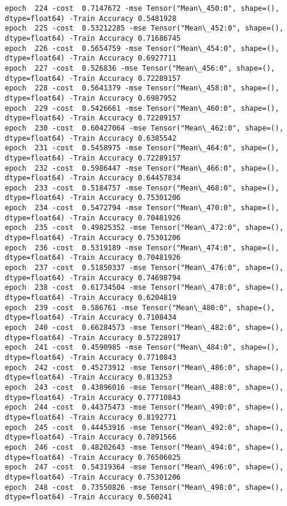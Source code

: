 \documentclass[11pt]{article}
\begin{document}
\begin{Verbatim}[commandchars=\\\{\}]
epoch  224 -cost  0.7147672 -mse Tensor("Mean\_450:0", shape=(), dtype=float64) -Train Accuracy 0.5481928
epoch  225 -cost  0.53212285 -mse Tensor("Mean\_452:0", shape=(), dtype=float64) -Train Accuracy 0.71686745
epoch  226 -cost  0.5654759 -mse Tensor("Mean\_454:0", shape=(), dtype=float64) -Train Accuracy 0.6927711
epoch  227 -cost  0.526836 -mse Tensor("Mean\_456:0", shape=(), dtype=float64) -Train Accuracy 0.72289157
epoch  228 -cost  0.5641379 -mse Tensor("Mean\_458:0", shape=(), dtype=float64) -Train Accuracy 0.6987952
epoch  229 -cost  0.5426661 -mse Tensor("Mean\_460:0", shape=(), dtype=float64) -Train Accuracy 0.72289157
epoch  230 -cost  0.60427064 -mse Tensor("Mean\_462:0", shape=(), dtype=float64) -Train Accuracy 0.6385542
epoch  231 -cost  0.5458975 -mse Tensor("Mean\_464:0", shape=(), dtype=float64) -Train Accuracy 0.72289157
epoch  232 -cost  0.5986447 -mse Tensor("Mean\_466:0", shape=(), dtype=float64) -Train Accuracy 0.64457834
epoch  233 -cost  0.5184757 -mse Tensor("Mean\_468:0", shape=(), dtype=float64) -Train Accuracy 0.75301206
epoch  234 -cost  0.5472794 -mse Tensor("Mean\_470:0", shape=(), dtype=float64) -Train Accuracy 0.70481926
epoch  235 -cost  0.49825352 -mse Tensor("Mean\_472:0", shape=(), dtype=float64) -Train Accuracy 0.75301206
epoch  236 -cost  0.5319189 -mse Tensor("Mean\_474:0", shape=(), dtype=float64) -Train Accuracy 0.70481926
epoch  237 -cost  0.51850337 -mse Tensor("Mean\_476:0", shape=(), dtype=float64) -Train Accuracy 0.74698794
epoch  238 -cost  0.61734504 -mse Tensor("Mean\_478:0", shape=(), dtype=float64) -Train Accuracy 0.6204819
epoch  239 -cost  0.586761 -mse Tensor("Mean\_480:0", shape=(), dtype=float64) -Train Accuracy 0.7108434
epoch  240 -cost  0.66284573 -mse Tensor("Mean\_482:0", shape=(), dtype=float64) -Train Accuracy 0.57228917
epoch  241 -cost  0.4590985 -mse Tensor("Mean\_484:0", shape=(), dtype=float64) -Train Accuracy 0.7710843
epoch  242 -cost  0.45273912 -mse Tensor("Mean\_486:0", shape=(), dtype=float64) -Train Accuracy 0.813253
epoch  243 -cost  0.43896016 -mse Tensor("Mean\_488:0", shape=(), dtype=float64) -Train Accuracy 0.77710843
epoch  244 -cost  0.44375473 -mse Tensor("Mean\_490:0", shape=(), dtype=float64) -Train Accuracy 0.8192771
epoch  245 -cost  0.44453916 -mse Tensor("Mean\_492:0", shape=(), dtype=float64) -Train Accuracy 0.7891566
epoch  246 -cost  0.48202643 -mse Tensor("Mean\_494:0", shape=(), dtype=float64) -Train Accuracy 0.76506025
epoch  247 -cost  0.54319364 -mse Tensor("Mean\_496:0", shape=(), dtype=float64) -Train Accuracy 0.75301206
epoch  248 -cost  0.73550826 -mse Tensor("Mean\_498:0", shape=(), dtype=float64) -Train Accuracy 0.560241

\end{Verbatim}
\end{document}
